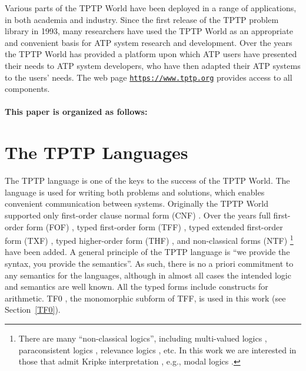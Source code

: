 \documentclass{easychair}
\newcommand{\smalltt}[1]{\small \texttt{#1}}
\begin{document}
Various parts of the TPTP World have been deployed in a range of applications,
in both academia and industry.
Since the first release of the TPTP problem library in 1993, many researchers have used the 
TPTP World as an appropriate and convenient basis for ATP system research and development. 
Over the years the TPTP World has provided a platform upon which ATP users have presented their 
needs to ATP system developers, who have then adapted their ATP systems to the users’ needs.
The web page {\smalltt{\url{https://www.tptp.org}}} provides access to all components.

\paragraph{This paper is organized as follows:}

\section{The TPTP Languages}
\label{Languages}

The TPTP language \cite{Sut23-IGPL} is one of the keys to the success of the TPTP World.
The language is used for writing both problems and solutions,
which enables convenient communication between systems. 
Originally the TPTP World supported only first-order clause normal form (CNF)
\cite{SS98-JAR}.
Over the years full first-order form (FOF)
\cite{Sut09}, 
typed first-order form (TFF)
\cite{SS+12,BP13-TFF1}, 
typed extended first-order form (TXF)
\cite{SK18}, 
typed higher-order form (THF)
\cite{SB10,KSR16}, 
and non-classical forms (NTF)
\footnote{%
There are many ``non-classical logics'', including multi-valued logics \cite{Aug17},
paraconsistent logics \cite{Pri02}, relevance logics \cite{AB75}, etc.
In this work we are interested in those that admit Kripke interpretation \cite{Kri63},
e.g., modal logics \cite{BBW06}.}
\cite{SF+22} 
have been added.
A general principle of the TPTP language is ``we provide the syntax, you provide the semantics''.
As such, there is no a priori commitment to any semantics for the languages, although in almost 
all cases the intended logic and semantics are well known.
All the typed forms include constructs for arithmetic.
TF0 \cite{SS+12}, the monomorphic subform of TFF, is used in this work (see Section~\ref{TF0}).
\end{document}

